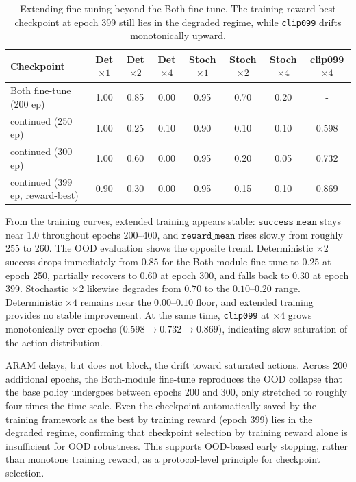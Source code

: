 \begin{table}[t]
\centering
\caption{Extending fine-tuning beyond the Both fine-tune. The
training-reward-best checkpoint at epoch 399 still lies in the
degraded regime, while \texttt{clip099} drifts monotonically upward.}
\label{tab:contft}
\scriptsize
\setlength{\tabcolsep}{3pt}
\begin{tabular}{lccccccc}
\toprule
Checkpoint & Det $\times1$ & Det $\times2$ & Det $\times4$
           & Stoch $\times1$ & Stoch $\times2$ & Stoch $\times4$ & clip099 $\times4$ \\
\midrule
Both fine-tune (200 ep)              & 1.00 & 0.85 & 0.00 & 0.95 & 0.70 & 0.20 & - \\
continued (250 ep)             & 1.00 & 0.25 & 0.10 & 0.90 & 0.10 & 0.10 & 0.598 \\
continued (300 ep)            & 1.00 & 0.60 & 0.00 & 0.95 & 0.20 & 0.05 & 0.732 \\
continued (399 ep, reward-best)
                                & 0.90 & 0.30 & 0.00 & 0.95 & 0.15 & 0.10 & 0.869 \\
\bottomrule
\end{tabular}
\end{table}

From the training curves, extended training appears stable:
$\texttt{success\_mean}$ stays near $1.0$ throughout epochs
200--400, and $\texttt{reward\_mean}$ rises slowly from roughly 255
to 260. The OOD evaluation shows the opposite trend. Deterministic
$\times2$ success drops immediately from $0.85$ for
the Both-module fine-tune to $0.25$ at epoch 250, partially
recovers to $0.60$ at epoch 300, and falls back to $0.30$ at
epoch 399. Stochastic $\times2$ likewise degrades from $0.70$ to
the $0.10$--$0.20$ range. Deterministic $\times4$ remains near the
$0.00$--$0.10$ floor, and extended training provides no stable
improvement. At the same time, \texttt{clip099} at $\times4$ grows
monotonically over epochs ($0.598 \to 0.732 \to 0.869$), indicating
slow saturation of the action distribution.

ARAM delays, but does not block, the drift toward saturated actions.
Across 200 additional epochs,
the Both-module fine-tune reproduces the OOD collapse that
the base policy undergoes between epochs 200 and 300, only stretched
to roughly four times the time scale. Even the checkpoint
automatically saved by the training framework as the best by training
reward (epoch 399) lies in the degraded regime, confirming
that checkpoint selection by training reward alone is insufficient
for OOD robustness. This supports OOD-based early stopping, rather
than monotone training reward, as a protocol-level principle for
checkpoint selection.


